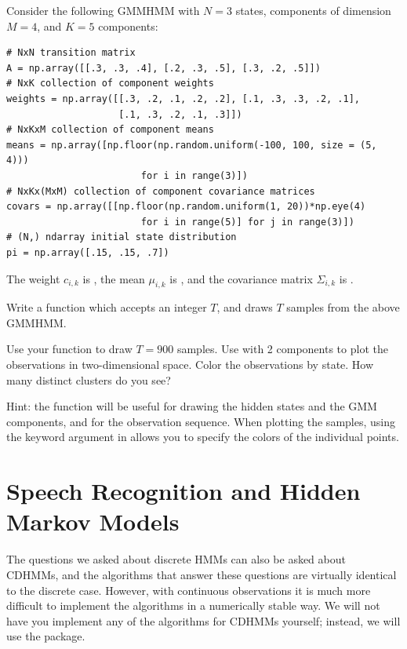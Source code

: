 \begin{problem}
Consider the following GMMHMM with $N=3$ states, components of dimension $M = 4$, and $K=5$ components:
\begin{lstlisting}
# NxN transition matrix 
A = np.array([[.3, .3, .4], [.2, .3, .5], [.3, .2, .5]])
# NxK collection of component weights
weights = np.array([[.3, .2, .1, .2, .2], [.1, .3, .3, .2, .1], 
                    [.1, .3, .2, .1, .3]])
# NxKxM collection of component means
means = np.array([np.floor(np.random.uniform(-100, 100, size = (5, 4))) 
                        for i in range(3)])
# NxKx(MxM) collection of component covariance matrices       
covars = np.array([[np.floor(np.random.uniform(1, 20))*np.eye(4) 
                        for i in range(5)] for j in range(3)])
# (N,) ndarray initial state distribution 
pi = np.array([.15, .15, .7])
\end{lstlisting}
The weight $c_{i,k}$ is , the mean $\mu_{i,k}$ is , and the covariance matrix $\Sigma_{i,k}$ is .

Write a function  which accepts an integer $T$, and draws $T$ samples from the above GMMHMM.

Use your function to draw $T=900$ samples.
Use  with 2 components to plot the observations in two-dimensional space. 
Color the observations by state.
How many distinct clusters do you see?

Hint: the function  will be useful for drawing the hidden states and the GMM components, and  for the observation sequence. 
When plotting the samples, using the keyword argument  in  allows you to specify the colors of the individual points.
\end{problem}

\section*{Speech Recognition and Hidden Markov Models}
The questions we asked about discrete HMMs can also be asked about CDHMMs, and the algorithms that answer these questions are virtually identical to the discrete case.
However, with continuous observations it is much more difficult to implement the algorithms in a numerically stable way.
We will not have you implement any of the algorithms for CDHMMs yourself; instead, we will use the  package.

